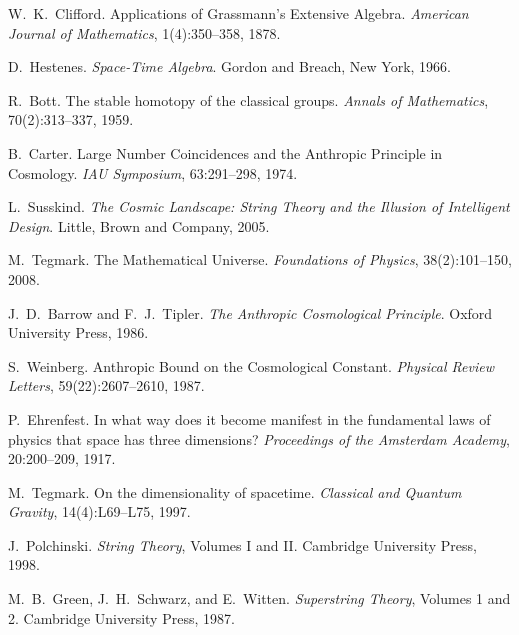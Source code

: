 \documentclass[11pt,a4paper]{article}
\numberwithin{equation}{section}
\theoremstyle{plain}
\theoremstyle{definition}
\theoremstyle{remark}
\begin{document}
\begin{thebibliography}{99}

W.~K.~Clifford.
\newblock Applications of Grassmann's Extensive Algebra.
\newblock \emph{American Journal of Mathematics}, 1(4):350--358, 1878.

D.~Hestenes.
\newblock \emph{Space-Time Algebra}.
\newblock Gordon and Breach, New York, 1966.

R.~Bott.
\newblock The stable homotopy of the classical groups.
\newblock \emph{Annals of Mathematics}, 70(2):313--337, 1959.

B.~Carter.
\newblock Large Number Coincidences and the Anthropic Principle in Cosmology.
\newblock \emph{IAU Symposium}, 63:291--298, 1974.

L.~Susskind.
\newblock \emph{The Cosmic Landscape: String Theory and the Illusion of Intelligent Design}.
\newblock Little, Brown and Company, 2005.

M.~Tegmark.
\newblock The Mathematical Universe.
\newblock \emph{Foundations of Physics}, 38(2):101--150, 2008.

J.~D.~Barrow and F.~J.~Tipler.
\newblock \emph{The Anthropic Cosmological Principle}.
\newblock Oxford University Press, 1986.

S.~Weinberg.
\newblock Anthropic Bound on the Cosmological Constant.
\newblock \emph{Physical Review Letters}, 59(22):2607--2610, 1987.

P.~Ehrenfest.
\newblock In what way does it become manifest in the fundamental laws of physics that space has three dimensions?
\newblock \emph{Proceedings of the Amsterdam Academy}, 20:200--209, 1917.

M.~Tegmark.
\newblock On the dimensionality of spacetime.
\newblock \emph{Classical and Quantum Gravity}, 14(4):L69--L75, 1997.

J.~Polchinski.
\newblock \emph{String Theory}, Volumes I and II.
\newblock Cambridge University Press, 1998.

M.~B.~Green, J.~H.~Schwarz, and E.~Witten.
\newblock \emph{Superstring Theory}, Volumes 1 and 2.
\newblock Cambridge University Press, 1987.

\end{thebibliography}

\end{document}
